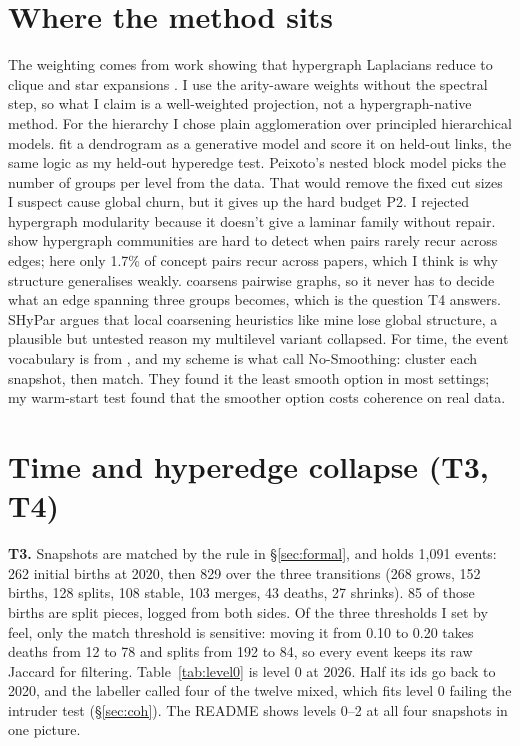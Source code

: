\documentclass[10pt,a4paper]{article}
\newcommand{\code}[1]{\texttt{\small\detokenize{#1}}}
\newcommand{\para}[1]{\textbf{#1}\hspace{0.4em}}
\begin{document}
\section{Where the method sits}

The weighting comes from work showing that hypergraph Laplacians reduce to clique and star expansions
\citep{zhou2006,agarwal2006}. I use the arity-aware weights without the spectral step, so what I claim is
a well-weighted projection, not a hypergraph-native method. For the hierarchy I chose plain agglomeration
over principled hierarchical models. \citet{clauset2008} fit a dendrogram as a generative model and score
it on held-out links, the same logic as my held-out hyperedge test. Peixoto's nested block model
\citep{peixoto2014} picks the number of groups per level from the data. That would remove the fixed cut
sizes I suspect cause global churn, but it gives up the hard budget P2. I rejected hypergraph modularity
\citep{kumar2020} because it doesn't give a laminar family without repair. \citet{ruggeri2023} show
hypergraph communities are hard to detect when pairs rarely recur across edges; here only 1.7\% of
concept pairs recur across papers, which I think is why structure generalises weakly. \citet{loukas2019}
coarsens pairwise graphs, so it never has to decide what an edge spanning three groups becomes, which is
the question T4 answers. SHyPar \citep{sajadinia2024} argues that local coarsening heuristics like mine
lose global structure, a plausible but untested reason my multilevel variant collapsed. For time, the
event vocabulary is from \citet{greene2010}, and my scheme is what \citet{asgari2023} call No-Smoothing:
cluster each snapshot, then match. They found it the least smooth option in most settings; my warm-start
test found that the smoother option costs coherence on real data.

\section{Time and hyperedge collapse (T3, T4)}
\label{sec:time}

\para{T3.} Snapshots are matched by the rule in §\ref{sec:formal}, and \code{temporal_events.json} holds
1,091 events: 262 initial births at 2020, then 829 over the three transitions (268 grows, 152 births, 128
splits, 108 stable, 103 merges, 43 deaths, 27 shrinks). 85 of those births are split pieces, logged from
both sides. Of the three
thresholds I set by feel, only the match threshold is sensitive: moving it from 0.10 to 0.20 takes deaths
from 12 to 78 and splits from 192 to 84, so every event keeps its raw Jaccard for filtering.
Table~\ref{tab:level0} is level 0 at 2026. Half its ids go back to 2020, and the labeller called four of
the twelve mixed, which fits level 0 failing the intruder test (§\ref{sec:coh}). The README shows levels 0--2
at all four snapshots in one picture.
\end{document}
